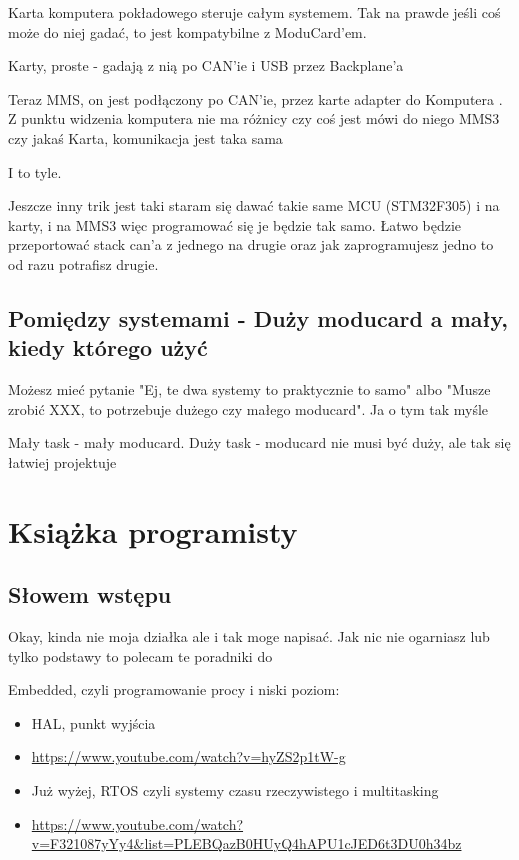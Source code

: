 \documentclass[b5paper, 10pt, twoside]{book}
\begin{document}
Karta komputera pokładowego steruje całym systemem. Tak na prawde jeśli coś może do niej gadać, to jest kompatybilne z ModuCard'em.

Karty, proste - gadają z nią po CAN'ie i USB przez Backplane'a

Teraz MMS, on jest podłączony po CAN'ie, przez karte adapter do Komputera . Z punktu widzenia komputera nie ma różnicy czy coś jest mówi do niego MMS3 czy jakaś Karta, komunikacja jest taka sama

I to tyle.

Jeszcze inny trik jest taki staram się dawać takie same MCU (STM32F305) i na karty, i na MMS3 więc programować się je będzie tak samo. Łatwo będzie przeportować stack can'a z jednego na drugie oraz jak zaprogramujesz jedno to od razu potrafisz drugie.

\section{Pomiędzy systemami - Duży moducard a mały, kiedy którego użyć} \label{Kiedy_ktorego_uzyc}
Możesz mieć pytanie "Ej, te dwa systemy to praktycznie to samo" albo "Musze zrobić XXX, to potrzebuje dużego czy małego moducard". Ja o tym tak myśle


Mały task - mały moducard. Duży task - moducard nie musi być duży, ale tak się łatwiej projektuje

\chapter{Książka programisty}
\section{Słowem wstępu}
Okay, kinda nie moja działka ale i tak moge napisać. Jak nic nie ogarniasz lub tylko podstawy to polecam te poradniki do 

Embedded, czyli programowanie procy i niski poziom:
\begin{itemize}
  \item HAL, punkt wyjścia 
  \item \url{https://www.youtube.com/watch?v=hyZS2p1tW-g}
  \item Już wyżej, RTOS czyli systemy czasu rzeczywistego i multitasking
  \item \url{https://www.youtube.com/watch?v=F321087yYy4&list=PLEBQazB0HUyQ4hAPU1cJED6t3DU0h34bz}
\end{itemize}
\end{document}
